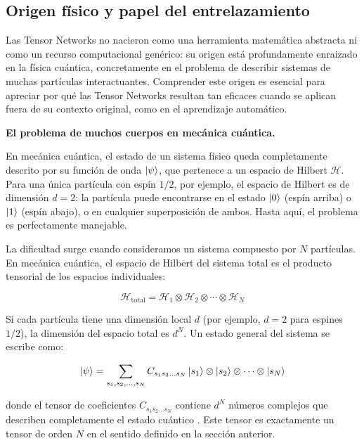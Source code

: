 \documentclass[11pt,a4paper]{report}
\newcommand{\refbox}[2]{%
  \begingroup
  \setlength{\fboxsep}{0.6pt}
  \fcolorbox{#1}{white}{\mbox{#2}}%
  \endgroup
}
\newcommand{\citebox}[1]{%
  \refbox{RefCiteGreen}{\cite{#1}}%
}
\begin{document}
\subsection{Origen físico y papel del entrelazamiento}
 
Las Tensor Networks no nacieron como una herramienta matemática abstracta ni como un recurso computacional genérico: su origen está profundamente enraizado en la física cuántica, concretamente en el problema de describir sistemas de muchas partículas interactuantes. Comprender este origen es esencial para apreciar por qué las Tensor Networks resultan tan eficaces cuando se aplican fuera de su contexto original, como en el aprendizaje automático.
 
\noindent\textbf{El problema de muchos cuerpos en mecánica cuántica.}
 
En mecánica cuántica, el estado de un sistema físico queda completamente descrito por su función de onda $\ket{\psi}$, que pertenece a un espacio de Hilbert $\mathcal{H}$. Para una única partícula con espín $1/2$, por ejemplo, el espacio de Hilbert es de dimensión $d = 2$: la partícula puede encontrarse en el estado $\ket{0}$ (espín arriba) o $\ket{1}$ (espín abajo), o en cualquier superposición de ambos. Hasta aquí, el problema es perfectamente manejable.
 
La dificultad surge cuando consideramos un sistema compuesto por $N$ partículas. En mecánica cuántica, el espacio de Hilbert del sistema total es el producto tensorial de los espacios individuales:
 
\begin{equation} \label{eq: hilbert_compuesto}
    \mathcal{H}_{\text{total}} = \mathcal{H}_1 \otimes \mathcal{H}_2 \otimes \cdots \otimes \mathcal{H}_N
\end{equation}
 
Si cada partícula tiene una dimensión local $d$ (por ejemplo, $d = 2$ para espines $1/2$), la dimensión del espacio total es $d^N$. Un estado general del sistema se escribe como:
 
\begin{equation} \label{eq: estado_general}
    \ket{\psi} = \sum_{s_1, s_2, \ldots, s_N} C_{s_1 s_2 \ldots s_N} \ket{s_1} \otimes \ket{s_2} \otimes \cdots \otimes \ket{s_N}
\end{equation}
 
donde el tensor de coeficientes $C_{s_1 s_2 \ldots s_N}$ contiene $d^N$ números complejos que describen completamente el estado cuántico \citebox{wang2023tensor}. Este tensor es exactamente un tensor de orden $N$ en el sentido definido en la sección anterior.
 
\end{document}
